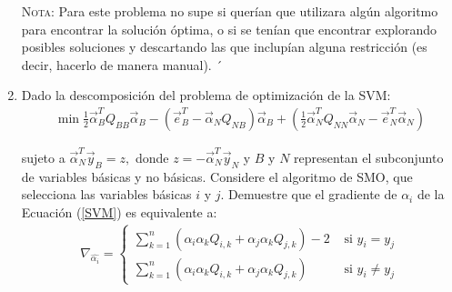 \documentclass[11pt,letterpaper]{article}
\newcommand{\sumk}{\sum_{k=1}^n}
\begin{document}
\begin{enumerate}
\textsc{Nota:} Para este problema no supe si querían que utilizara algún algoritmo para encontrar la solución óptima, o si se tenían que encontrar explorando posibles soluciones y descartando las que inclupían alguna restricción (es decir, hacerlo de manera manual). ´

\item Dado la descomposición del problema de optimización de la SVM:
\begin{align}\label{SVM}
\min \frac{1}{2}\overrightarrow{\alpha}_{B}^T Q_{BB}\overrightarrow{\alpha}_B-(\overrightarrow{e}_B^T-\overrightarrow{\alpha}_N Q_{NB})\overrightarrow{\alpha}_B+\left(\frac{1}{2}\overrightarrow{\alpha}_N^T Q_{NN}\overrightarrow{\alpha}_N-\overrightarrow{e}_N^T\overrightarrow{\alpha}_N\right)
\end{align}

sujeto a $\overrightarrow{\alpha}_N^T\overrightarrow{y}_B=z,$ donde $z=-\overrightarrow{\alpha}_N^T\overrightarrow{y}_N$ y $B$ y $N$ representan el subconjunto de variables básicas y no básicas. Considere el algoritmo de SMO, que selecciona las variables básicas $i$ y $j$. Demuestre que el gradiente de $\alpha_i$ de la Ecuación (\ref{SVM}) es equivalente a:
\begin{align*}
\nabla_{\hat{\alpha_i}} = \left\{
\begin{array}{cc}
\sumk \left( \alpha_i \alpha_k Q_{i,k}+\alpha_j\alpha_kQ_{j,k}\right)-2& \text{ si } y_i=y_j\\ 
\sumk \left( \alpha_i \alpha_k Q_{i,k} +\alpha_j\alpha_kQ_{j,k}\right)& \text{ si } y_i\neq y_j \end{array}\right.
\end{align*}


\end{enumerate}
\end{document}

